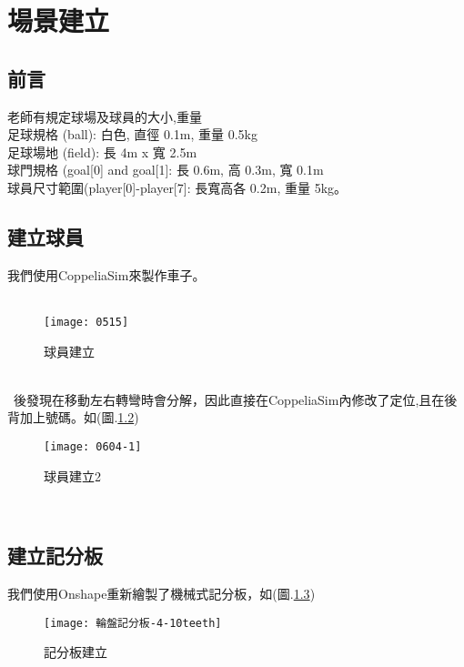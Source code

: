 \chapter{場景建立}
\renewcommand{\baselinestretch}{10.0} %
\setcounter{page}{1}  %
\fontsize{14pt}{2.5pt}\sectionef
\section{前言}
老師有規定球場及球員的大小,重量\\
足球規格 (ball): 白色, 直徑 0.1m, 重量 0.5kg\\
足球場地 (field): 長 4m x 寬 2.5m\\
球門規格 (goal[0] and goal[1]: 長 0.6m, 高 0.3m, 寬 0.1m\\
球員尺寸範圍(player[0]-player[7]: 長寬高各 0.2m, 重量 5kg。\\
\section{建立球員}
我們使用CoppeliaSim來製作車子。\\
\

\begin{figure}[hbt!]
\begin{center}
\texttt{[image: 0515]}
\caption{\Large 球員建立}\label{球員建立}
\end{center}
\end{figure}
\\
\
後發現在移動左右轉彎時會分解，因此直接在CoppeliaSim內修改了定位,且在後背加上號碼。如(圖.\ref{球員建立2})\\

\begin{figure}[hbt!]
\begin{center}
\texttt{[image: 0604-1]}
\caption{\Large 球員建立2}\label{球員建立2}
\end{center}
\end{figure}\

\section{建立記分板}
我們使用Onshape重新繪製了機械式記分板，如(圖.\ref{記分板建立})\\

\begin{figure}[hbt!]
\begin{center}
\texttt{[image: 輪盤記分板-4-10teeth]}
\caption{\Large 記分板建立}\label{記分板建立}
\end{center}
\end{figure}\

